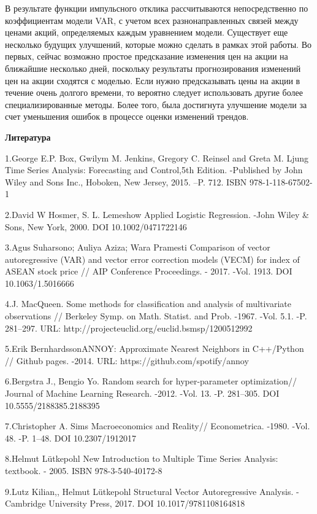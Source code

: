 \documentclass[
]{article}
\begin{document}
В результате функции импульсного отклика рассчитываются непосредственно
по коэффициентам модели VAR, с учетом всех разнонаправленных связей
между ценами акций, определяемых каждым уравнением модели. Существует
еще несколько будущих улучшений, которые можно сделать в рамках этой
работы. Во первых, сейчас возможно простое предсказание изменения цен на
акции на ближайшие несколько дней, поскольку результаты прогнозирования
изменений цен на акции сходятся с моделью. Если нужно предсказывать цены
на акции в течение очень долгого времени, то вероятно следует
использовать другие более специализированные методы. Более того, была
достигнута улучшение модели за счет уменьшения ошибок в процессе оценки
изменений трендов.

\textbf{Литература}

1.George E.P. Box, Gwilym M. Jenkins, Gregory C. Reinsel and Greta M.
Ljung Time Series Analysis: Forecasting and Control,5th Edition.
-Published by John Wiley and Sons Inc., Hoboken, New Jersey, 2015. --P.
712. ISBN 978-1-118-67502-1

2.David W Hosmer, S. L. Lemeshow Applied Logistic Regression. -John
Wiley \& Sons, New York, 2000. DOI 10.1002/0471722146

3.Agus Suharsono; Auliya Aziza; Wara Pramesti Comparison of vector
autoregressive (VAR) and vector error correction models (VECM) for index
of ASEAN stock price // AIP Conference Proceedings. - 2017. -Vol. 1913.
DOI 10.1063/1.5016666

4.J. MacQueen. Some methods for classification and analysis of
multivariate observations // Berkeley Symp. on Math. Statist. and Prob.
-1967. -Vol. 5.1. -P. 281--297. URL:
http://projecteuclid.org/euclid.bsmsp/1200512992

5.Erik BernhardssonANNOY: Approximate Nearest Neighbors in C++/Python //
Github pages. -2014. URL: https://github.com/spotify/annoy

6.Bergstra J., Bengio Yo. Random search for hyper-parameter
optimization// Journal of Machine Learning Research. -2012. -Vol. 13.
-P. 281--305. DOI 10.5555/2188385.2188395

7.Christopher A. Sims Macroeconomics and Reality// Econometrica. -1980.
-Vol. 48. -P. 1--48. DOI 10.2307/1912017

8.Helmut Lütkepohl New Introduction to Multiple Time Series Analysis:
textbook. - 2005. ISBN 978-3-540-40172-8

9.Lutz Kilian,, Helmut Lütkepohl Structural Vector Autoregressive
Analysis. -Cambridge University Press, 2017. DOI 10.1017/9781108164818
\end{document}
